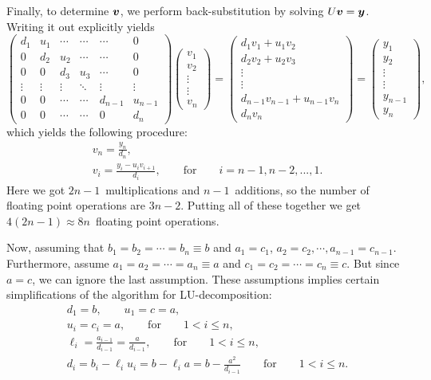 \documentclass[english,notitlepage]{revtex4-1}  %
\begin{document}
Finally, to determine $\vb*{v}$, we perform back-substitution by solving $U\vb*{v} = \vb*{y}$. Writing it out explicitly yields 
\begin{equation}
	\begin{pmatrix}
	d_1 & u_1 & \cdots & \cdots &\cdots & 0 \\ 
	0 & d_2 & u_2 & \cdots & \cdots & 0 \\
	0 & 0 & d_3 & u_3 & \cdots & 0 \\
	\vdots & \vdots & \vdots & \ddots & \vdots & \vdots \\
	0 & 0 & \cdots & \cdots & d_{n-1} & u_{n-1} \\
	0 & 0 & \cdots & \cdots & 0 & d_n
	\end{pmatrix}
	\begin{pmatrix}
	v_1 \\ v_2 \\ \vdots \\ \vdots \\ v_n
	\end{pmatrix}
	= 
	\begin{pmatrix}
	d_1v_1 + u_1v_2 \\
	d_2v_2 + u_2v_3 \\ 
	\vdots \\ 
	\vdots \\
	d_{n-1}v_{n-1} + u_{n-1}v_n \\ 
	d_nv_n
	\end{pmatrix}
	=
	\begin{pmatrix}
	y_1 \\ y_2 \\ \vdots \\ \vdots \\ y_{n-1} \\ y_n 
	\end{pmatrix},
\end{equation}
which yields the following procedure: 
\begin{gather}
	v_n = \frac{y_n}{d_n}, \\
	v_i = \frac{y_i - u_iv_{i+1}}{d_i}, \qquad \text{for} \qquad i = n-1, n-2, ..., 1.
\end{gather}
Here we got $2n-1$ multiplications and $n-1$ additions, so the number of floating point operations are $3n-2$. Putting all of these together we get $4(2n-1) \approx 8n $ floating point operations.


Now, assuming that $b_1 = b_2 = \cdots = b_n \equiv b$ and $a_1 = c_1$, $a_2 = c_2,  \cdots, a_{n-1} = c_{n-1}$. Furthermore, assume $a_1 = a_2 = \cdots = a_n \equiv a$ and 
$c_1 = c_2 = \cdots = c_n \equiv c$. But since $a = c$, we can ignore the last assumption. These assumptions implies certain simplifications of the algorithm for LU-decomposition:
\begin{gather}
	d_1 = b, \qquad u_1 = c = a, \\
	u_i = c_i = a, \qquad \text{for} \qquad 1 < i \leq n,\\
	\ell_i = \frac{a_{i-1}}{d_{i-1}} = \frac{a}{d_{i-1}}, \qquad \text{for} \qquad 1 < i \leq n,\\
	d_i = b_i - \ell_iu_i = b - \ell_ia = b - \frac{a^2}{d_{i-1}} \qquad \text{for} \qquad 1 < i \leq n.
\end{gather}
\end{document}
